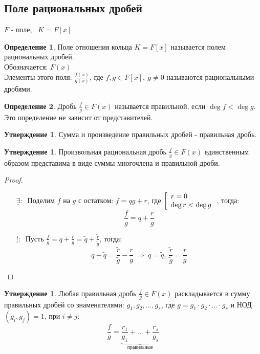 \documentclass[a4paper, 12pt]{article}
\newcommand\tab[1][.5cm]{\hspace*{#1}}
\newcounter{thcount}
\newcounter{subthcount}
\theoremstyle{definition}
\newtheorem*{definition}{Определение}
\newtheorem{subtheoremnum}[subthcount]{Утверждение}
\begin{document}
  \subsection{Поле рациональных дробей}
  $F$ - поле, \ $K = F[x]$
  \begin{definition}
    Поле отношения кольца $K = F[x]$ называется полем рациональных дробей.\\
    Обозначается: $F(x)$\\
    Элементы этого поля: $\frac{f(x)}{g(x)}$, где $f, g \in F[x], \ g\neq 0$ называются рациональными дробями.    
  \end{definition}
  \begin{definition}
    Дробь $\frac{f}{g} \in F(x)$ называется правильной, если $\deg f < \deg g$. Это определение не зависит от представителей.
  \end{definition}
  \begin{subtheoremnum}
    Сумма и произведение правильных дробей - правильная дробь.
  \end{subtheoremnum}
  \begin{subtheoremnum}
    Произвольная рациональная дробь $\frac{f}{g} \in F(x)$ единственным образом представима в виде суммы многочлена и правильной дроби.
  \end{subtheoremnum}
  \begin{proof}\tab
    \begin{itemize}
      \item[$\underline{\exists} : \ $ ] Поделим $f$ на $g$ с остатком: $f = qg + r$, где $\left[ \begin{array}{l l}
        r=0\\
        \deg r < \deg g
        \end{array} \right.$, тогда: 
        $$\frac{f}{g} = q + \frac{r}{g}$$ 
      \item[$\underline{!} : \ $ ] Пусть $\frac{f}{g} = q + \frac{r}{g} = \widetilde{q} + \frac{\widetilde{r}}{\widetilde{g}}$, тогда: 
      $$q - \widetilde{q} = \frac{\widetilde{r}}{\widetilde{g}} - \frac{r}{g} \ \Longrightarrow  \ q = \widetilde{q}, \ \frac{\widetilde{r}}{\widetilde{g}} = \frac{r}{g}$$ 
    \end{itemize}
  \end{proof} 
  \begin{subtheoremnum}
    Любая правильная дробь $\frac{f}{g} \in F(x)$ раскладывается в сумму правильных дробей со знаменателями: $g_1, g_2,...,g_s$, где $g = g_1 \cdot g_2 \cdot ... \cdot g_s$ и НОД$(g_i, g_j) = 1$, при $i \neq j$:
    $$\frac{f}{g} = \underbrace{\frac{r_1}{g_1} + ... + \frac{r_s}{g_s}}_{ \text{правильные}}$$
  \end{subtheoremnum}
\end{document}
